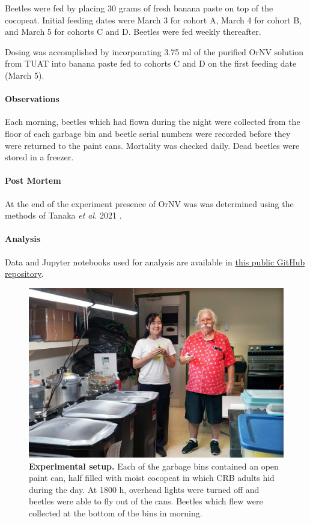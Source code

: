 \documentclass[12pt,letterpaper,english,bibliography=totocnumbered, abstract=on]{scrartcl}
\begin{document}
Beetles were fed by placing 30 grams of fresh banana paste on top of the cocopeat. Initial feeding dates were March 3 for cohort A, March 4 for cohort B, and March 5 for cohorts C and D. Beetles were fed weekly thereafter. 

Dosing was accomplished by incorporating 3.75 ml of the purified OrNV solution from TUAT into banana paste fed to cohorts C and D on the first feeding date (March 5).

\paragraph{Observations}

Each morning, beetles which had flown during the night were collected from the floor of each garbage bin and beetle serial numbers were recorded before they were returned to the paint cans. Mortality was checked daily. Dead beetles were stored in a freezer.

\paragraph{Post Mortem}

At the end of the experiment presence of OrNV was was determined using the methods of Tanaka \textit{et al.} 2021 \cite{tanakaConfirmationOryctesRhinoceros2021a}.

\paragraph{Analysis}

Data and Jupyter notebooks used for analysis are available in \href{https://github.com/aubreymoore/crb-flight-test}{this public GitHub repository}. 

\begin{figure}[H]
	\centering
	\includegraphics[width=\linewidth]{images/2023-uog-crb-moore-yamauchi-web}
	\caption{\textbf{Experimental setup.} Each of the garbage bins contained an open paint can, half filled with moist cocopeat in which CRB adults hid during the day. At 1800 h, overhead lights were turned off and beetles were able to fly out of the cans. Beetles which flew were collected at the bottom of the bins in morning.}
	\label{fig:2023-uog-crb-moore-yamauchi-web}
\end{figure}
\end{document}
